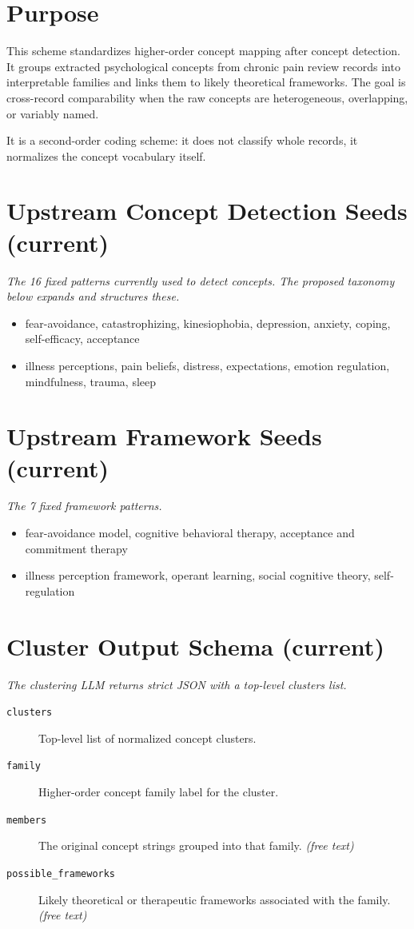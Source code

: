 \documentclass[11pt]{article}
\begin{document}
\section*{Purpose}
This scheme standardizes higher-order concept mapping after concept detection. It groups extracted psychological concepts from chronic pain review records into interpretable families and links them to likely theoretical frameworks. The goal is cross-record comparability when the raw concepts are heterogeneous, overlapping, or variably named.

It is a second-order coding scheme: it does not classify whole records, it normalizes the concept vocabulary itself.


\section*{Upstream Concept Detection Seeds (current)}
{\small\itshape The 16 fixed patterns currently used to detect concepts. The proposed taxonomy below expands and structures these.}\par\smallskip
\begin{itemize}
\item fear-avoidance, catastrophizing, kinesiophobia, depression, anxiety, coping, self-efficacy, acceptance
\item illness perceptions, pain beliefs, distress, expectations, emotion regulation, mindfulness, trauma, sleep
\end{itemize}

\section*{Upstream Framework Seeds (current)}
{\small\itshape The 7 fixed framework patterns.}\par\smallskip
\begin{itemize}
\item fear-avoidance model, cognitive behavioral therapy, acceptance and commitment therapy
\item illness perception framework, operant learning, social cognitive theory, self-regulation
\end{itemize}

\section*{Cluster Output Schema (current)}
{\small\itshape The clustering LLM returns strict JSON with a top-level clusters list.}\par\smallskip
\begin{description}
\item[\texttt{clusters}] Top-level list of normalized concept clusters.
\item[\texttt{family}] Higher-order concept family label for the cluster.
\item[\texttt{members}] The original concept strings grouped into that family. \textit{(free text)}
\item[\texttt{possible\_frameworks}] Likely theoretical or therapeutic frameworks associated with the family. \textit{(free text)}
\end{description}
\end{document}

